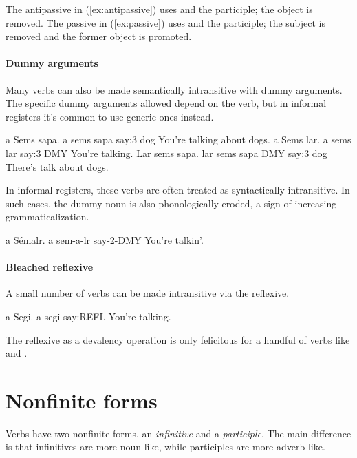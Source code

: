 The antipassive in (\ref{ex:antipassive}) uses  and the participle; the object is removed. The passive in (\ref{ex:passive}) uses  and the participle; the subject is removed and the former object is promoted.

\paragraph{Dummy arguments}
Many verbs can also be made semantically intransitive with dummy arguments. The specific dummy arguments allowed depend on the verb, but in informal registers it's common to use generic ones instead.

\begin{subexamples}
	\ex
		\script a Sems sapa.
		\bits a sems sapa
		 say:3 dog
		\tr You're talking about dogs.
	\ex
		\script a Sems lar.
		\bits a sems lar
		 say:3 DMY
		\tr You're talking.
	\ex
		\script Lar sems sapa.
		\bits lar sems sapa
		\gloss DMY say:3 dog
		\tr There's talk about dogs.
\end{subexamples}

In informal registers, these verbs are often treated as syntactically intransitive. In such cases, the dummy noun is also phonologically eroded, a sign of increasing grammaticalization.

\begin{example}
	\script a Sémalr.
	\bits a sem-a-lr
	 say-2-DMY
	\tr You're talkin'.
\end{example}

\paragraph{Bleached reflexive}
A small number of verbs can be made intransitive via the reflexive.

\begin{example}
	\script a Segi.
	\bits a segi
	 say:REFL
	\tr You're talking.
\end{example}

The reflexive as a devalency operation is only felicitous for a handful of verbs like  and .

\section{Nonfinite forms} \label{sec:nonfinite}
Verbs have two nonfinite forms, an \emph{infinitive} and a \emph{participle}. The main difference is that infinitives are more noun-like, while participles are more adverb-like.

